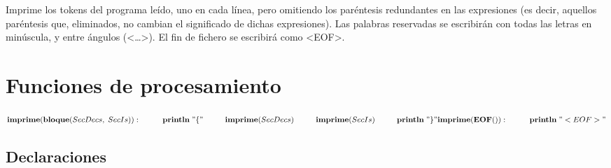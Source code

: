 Imprime los tokens del programa leído, uno en cada línea, pero omitiendo los paréntesis redundantes en las expresiones 
(es decir, aquellos paréntesis que, eliminados, no cambian el significado de dichas expresiones). 
Las palabras reservadas se escribirán con todas las letras en minúscula, y entre ángulos (<…>). 
El fin de fichero se escribirá como <EOF>.

\section{Funciones de procesamiento}

\begin{math}
    \textbf{imprime}(\textbf{bloque}(SecDecs, \; SecIs)): \\
        \phantom{---} \textbf{println} \; "\{" \\
        \phantom{---} \textbf{imprime}(SecDecs) \\
        \phantom{---} \textbf{imprime}(SecIs) \\
        \phantom{---} \textbf{println} \; "\}" \\
    \\
    \textbf{imprime}(\textbf{EOF}()): \\
        \phantom{---} \textbf{println} \; "<EOF>" \\
\end{math}

\subsection{Declaraciones}

